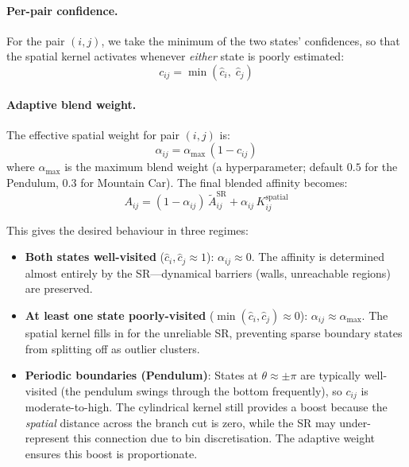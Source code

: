 \documentclass[11pt,a4paper]{article}
\begin{document}
\paragraph{Per-pair confidence.}
For the pair $(i,j)$, we take the minimum of the two states'
confidences, so that the spatial kernel activates whenever \emph{either}
state is poorly estimated:
\begin{equation}
c_{ij} = \min\!\left(\hat{c}_i,\;\hat{c}_j\right)
\end{equation}

\paragraph{Adaptive blend weight.}
The effective spatial weight for pair $(i,j)$ is:
\begin{equation}
\alpha_{ij} = \alpha_{\max}\,(1 - c_{ij})
\end{equation}
where $\alpha_{\max}$ is the maximum blend weight (a hyperparameter;
default $0.5$ for the Pendulum, $0.3$ for Mountain Car).  The final
blended affinity becomes:
\begin{equation}
\boxed{A_{ij} = (1 - \alpha_{ij})\,\widetilde{A}^{\text{SR}}_{ij} + \alpha_{ij}\,K^{\text{spatial}}_{ij}}
\end{equation}

This gives the desired behaviour in three regimes:

\begin{itemize}[leftmargin=2em]
\item \textbf{Both states well-visited}
($\hat{c}_i, \hat{c}_j \approx 1$): $\alpha_{ij} \approx 0$.
The affinity is determined almost entirely by the SR---dynamical barriers
(walls, unreachable regions) are preserved.

\item \textbf{At least one state poorly-visited}
($\min(\hat{c}_i, \hat{c}_j) \approx 0$):
$\alpha_{ij} \approx \alpha_{\max}$.  The spatial kernel fills in for the
unreliable SR, preventing sparse boundary states from splitting off as
outlier clusters.

\item \textbf{Periodic boundaries (Pendulum)}:  States at
$\theta \approx \pm\pi$ are typically well-visited (the pendulum swings
through the bottom frequently), so $c_{ij}$ is moderate-to-high.  The
cylindrical kernel still provides a boost because the \emph{spatial}
distance across the branch cut is zero, while the SR may under-represent
this connection due to bin discretisation.  The adaptive weight ensures
this boost is proportionate.
\end{itemize}
\end{document}
